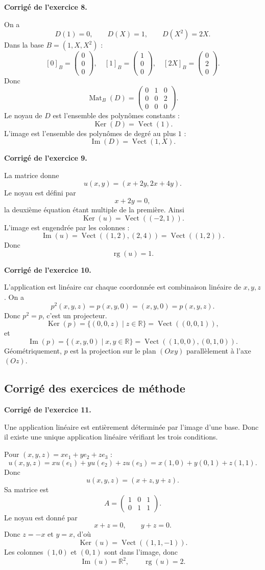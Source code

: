 \documentclass[11pt,a4paper]{article}
\newcommand{\corr}[1]{
    \vspace{0.35cm}
    \noindent\textbf{\textcolor{blue!60!black}{Corrigé de l'exercice #1.}}
    \par
}
\newcommand{\Ker}{\operatorname{Ker}}
\newcommand{\Img}{\operatorname{Im}}
\newcommand{\rg}{\operatorname{rg}}
\newcommand{\Mat}{\operatorname{Mat}}
\newcommand{\Vect}{\operatorname{Vect}}
\begin{document}
\corr{8}
On a
\[
D(1)=0,\qquad D(X)=1,\qquad D(X^2)=2X.
\]
Dans la base $B=(1,X,X^2)$ :
\[
[0]_B=\begin{pmatrix}0\\0\\0\end{pmatrix},\quad
[1]_B=\begin{pmatrix}1\\0\\0\end{pmatrix},\quad
[2X]_B=\begin{pmatrix}0\\2\\0\end{pmatrix}.
\]
Donc
\[
\Mat_B(D)=
\begin{pmatrix}
0&1&0\\
0&0&2\\
0&0&0
\end{pmatrix}.
\]
Le noyau de $D$ est l'ensemble des polynômes constants :
\[
\Ker(D)=\Vect(1).
\]
L'image est l'ensemble des polynômes de degré au plus $1$ :
\[
\Img(D)=\Vect(1,X).
\]

\corr{9}
La matrice donne
\[
u(x,y)=(x+2y,2x+4y).
\]
Le noyau est défini par
\[
x+2y=0,
\]
la deuxième équation étant multiple de la première. Ainsi
\[
\Ker(u)=\Vect((-2,1)).
\]
L'image est engendrée par les colonnes :
\[
\Img(u)=\Vect((1,2),(2,4))=\Vect((1,2)).
\]
Donc
\[
\rg(u)=1.
\]

\corr{10}
L'application est linéaire car chaque coordonnée est combinaison linéaire de $x,y,z$. On a
\[
p^2(x,y,z)=p(x,y,0)=(x,y,0)=p(x,y,z).
\]
Donc $p^2=p$, c'est un projecteur.
\[
\Ker(p)=\{(0,0,z)\mid z\in\mathbb{R}\}=\Vect((0,0,1)),
\]
et
\[
\Img(p)=\{(x,y,0)\mid x,y\in\mathbb{R}\}=\Vect((1,0,0),(0,1,0)).
\]
Géométriquement, $p$ est la projection sur le plan $(Oxy)$ parallèlement à l'axe $(Oz)$.

\subsection{Corrigé des exercices de méthode}

\corr{11}
Une application linéaire est entièrement déterminée par l'image d'une base. Donc il existe une unique application linéaire vérifiant les trois conditions.

Pour $(x,y,z)=xe_1+ye_2+ze_3$ :
\[
u(x,y,z)=xu(e_1)+yu(e_2)+zu(e_3)
=x(1,0)+y(0,1)+z(1,1).
\]
Donc
\[
u(x,y,z)=(x+z,y+z).
\]
Sa matrice est
\[
A=\begin{pmatrix}
1&0&1\\
0&1&1
\end{pmatrix}.
\]
Le noyau est donné par
\[
x+z=0,\qquad y+z=0.
\]
Donc $z=-x$ et $y=x$, d'où
\[
\Ker(u)=\Vect((1,1,-1)).
\]
Les colonnes $(1,0)$ et $(0,1)$ sont dans l'image, donc
\[
\Img(u)=\mathbb{R}^2,\qquad \rg(u)=2.
\]
\end{document}
